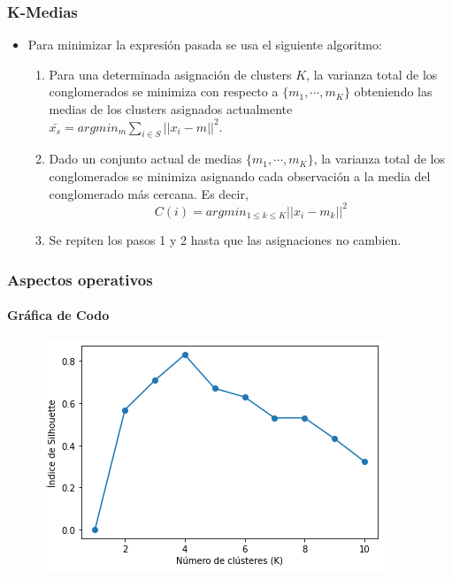 \documentclass[
  shownotes,
  xcolor={svgnames},
  hyperref={colorlinks,citecolor=DarkBlue,linkcolor=DarkRed,urlcolor=DarkBlue}
  , aspectratio=169]{beamer}
\begin{document}
\begin{frame}
\frametitle{K-Medias}

\begin{itemize}


\item Para minimizar la expresión pasada se usa el siguiente algoritmo: 
\begin{enumerate}
  \item Para una determinada asignación de clusters $K$, la varianza total de los conglomerados se minimiza con respecto a $\{m_1, \cdots , m_K\}$ obteniendo las medias de los clusters asignados actualmente $\bar{x_s}=argmin_m \sum_{i\in S} ||x_i - m||^2$. 
  \medskip
  \item Dado un conjunto actual de medias $\{m_1, \cdots , m_K\}$, la varianza total de los conglomerados se minimiza asignando cada observación a la media del conglomerado más cercana. Es decir, \[C(i)=argmin_{1\leq k \leq K} ||x_i-m_k||^2\] 
  \medskip
  \item Se repiten los pasos 1 y 2 hasta que las asignaciones no cambien.
\end{enumerate}

\end{itemize}

\end{frame}
\begin{frame}
\frametitle{Aspectos operativos}
\framesubtitle{Gráfica de Codo}



\begin{figure}[H] \centering

    \centering
    \includegraphics[scale=.7]{figures/output_36_0.png}
  \\
  \tiny
\end{figure}



\end{frame}
\end{document}
